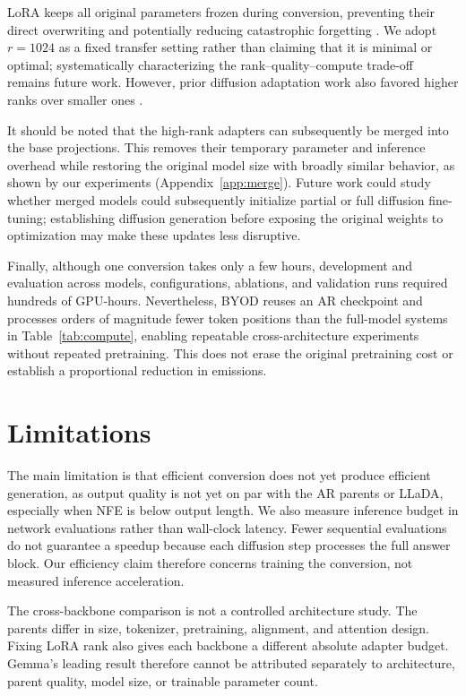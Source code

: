 \documentclass{article}
\begin{document}
LoRA keeps all original parameters frozen during conversion, preventing their direct overwriting and potentially reducing catastrophic forgetting \citep{luo2023catastrophic}. We adopt \(r=1024\) as a fixed transfer setting rather than claiming that it is minimal or optimal; systematically characterizing the rank–quality–compute trade-off remains future work. However, prior diffusion adaptation work also favored higher ranks over smaller ones \citep{kuiper2025lad}.

It should be noted that the high-rank adapters can subsequently be merged into the base projections. This removes their temporary parameter and inference overhead while restoring the original model size with broadly similar behavior, as shown by our experiments (Appendix~\ref{app:merge}). Future work could study whether merged models could subsequently initialize partial or full diffusion fine-tuning; establishing diffusion generation before exposing the original weights to optimization may make these updates less disruptive.

Finally, although one conversion takes only a few hours, development and evaluation across models, configurations, ablations, and validation runs required hundreds of GPU-hours. Nevertheless, BYOD reuses an AR checkpoint and processes orders of magnitude fewer token positions than the full-model systems in Table~\ref{tab:compute}, enabling repeatable cross-architecture experiments without repeated pretraining. This does not erase the original pretraining cost or establish a proportional reduction in emissions.

\section{Limitations}
The main limitation is that efficient conversion does not yet produce efficient generation, as output quality is not yet on par with the AR parents or LLaDA, especially when NFE is below output length. We also measure inference budget in network evaluations rather than wall-clock latency. Fewer sequential evaluations do not guarantee a speedup because each diffusion step processes the full answer block. Our efficiency claim therefore concerns training the conversion, not measured inference acceleration.

The cross-backbone comparison is not a controlled architecture study. The parents differ in size, tokenizer, pretraining, alignment, and attention design. Fixing LoRA rank also gives each backbone a different absolute adapter budget. Gemma's leading result therefore cannot be attributed separately to architecture, parent quality, model size, or trainable parameter count.
\end{document}

